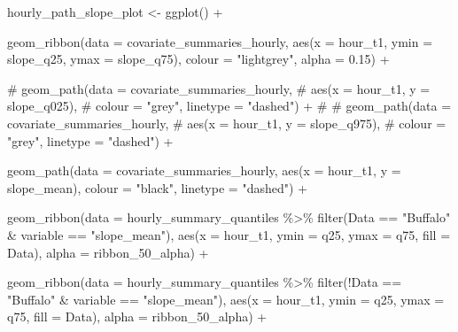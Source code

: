 \documentclass[
  letterpaper,
  DIV=11,
  numbers=noendperiod]{scrartcl}
\newenvironment{Shaded}{\begin{snugshade}}{\end{snugshade}}
\newcommand{\AttributeTok}[1]{\textcolor[rgb]{0.40,0.45,0.13}{#1}}
\newcommand{\CommentTok}[1]{\textcolor[rgb]{0.37,0.37,0.37}{#1}}
\newcommand{\FloatTok}[1]{\textcolor[rgb]{0.68,0.00,0.00}{#1}}
\newcommand{\FunctionTok}[1]{\textcolor[rgb]{0.28,0.35,0.67}{#1}}
\newcommand{\NormalTok}[1]{\textcolor[rgb]{0.00,0.23,0.31}{#1}}
\newcommand{\OtherTok}[1]{\textcolor[rgb]{0.00,0.23,0.31}{#1}}
\newcommand{\SpecialCharTok}[1]{\textcolor[rgb]{0.37,0.37,0.37}{#1}}
\newcommand{\StringTok}[1]{\textcolor[rgb]{0.13,0.47,0.30}{#1}}
\begin{document}
\begin{Shaded}
\begin{Highlighting}[]
\NormalTok{hourly\_path\_slope\_plot }\OtherTok{\textless{}{-}} \FunctionTok{ggplot}\NormalTok{() }\SpecialCharTok{+}
  
  \FunctionTok{geom\_ribbon}\NormalTok{(}\AttributeTok{data =}\NormalTok{ covariate\_summaries\_hourly,}
              \FunctionTok{aes}\NormalTok{(}\AttributeTok{x =}\NormalTok{ hour\_t1, }\AttributeTok{ymin =}\NormalTok{ slope\_q25, }\AttributeTok{ymax =}\NormalTok{ slope\_q75),}
              \AttributeTok{colour =} \StringTok{"lightgrey"}\NormalTok{, }\AttributeTok{alpha =} \FloatTok{0.15}\NormalTok{) }\SpecialCharTok{+}
  
  \CommentTok{\# geom\_path(data = covariate\_summaries\_hourly,}
  \CommentTok{\#           aes(x = hour\_t1, y = slope\_q025),}
  \CommentTok{\#           colour = "grey", linetype = "dashed") +}
  \CommentTok{\# }
  \CommentTok{\# geom\_path(data = covariate\_summaries\_hourly,}
  \CommentTok{\#           aes(x = hour\_t1, y = slope\_q975),}
  \CommentTok{\#           colour = "grey", linetype = "dashed") +}

  \FunctionTok{geom\_path}\NormalTok{(}\AttributeTok{data =}\NormalTok{ covariate\_summaries\_hourly,}
            \FunctionTok{aes}\NormalTok{(}\AttributeTok{x =}\NormalTok{ hour\_t1, }\AttributeTok{y =}\NormalTok{ slope\_mean),}
            \AttributeTok{colour =} \StringTok{"black"}\NormalTok{, }\AttributeTok{linetype =} \StringTok{"dashed"}\NormalTok{) }\SpecialCharTok{+}

  \FunctionTok{geom\_ribbon}\NormalTok{(}\AttributeTok{data =}\NormalTok{ hourly\_summary\_quantiles }\SpecialCharTok{\%\textgreater{}\%} 
                \FunctionTok{filter}\NormalTok{(Data }\SpecialCharTok{==} \StringTok{"Buffalo"} \SpecialCharTok{\&}\NormalTok{ variable }\SpecialCharTok{==} \StringTok{"slope\_mean"}\NormalTok{),}
              \FunctionTok{aes}\NormalTok{(}\AttributeTok{x =}\NormalTok{ hour\_t1, }\AttributeTok{ymin =}\NormalTok{ q25, }\AttributeTok{ymax =}\NormalTok{ q75, }\AttributeTok{fill =}\NormalTok{ Data),}
              \AttributeTok{alpha =}\NormalTok{ ribbon\_50\_alpha) }\SpecialCharTok{+}

  \FunctionTok{geom\_ribbon}\NormalTok{(}\AttributeTok{data =}\NormalTok{ hourly\_summary\_quantiles }\SpecialCharTok{\%\textgreater{}\%} 
                \FunctionTok{filter}\NormalTok{(}\SpecialCharTok{!}\NormalTok{Data }\SpecialCharTok{==} \StringTok{"Buffalo"} \SpecialCharTok{\&}\NormalTok{ variable }\SpecialCharTok{==} \StringTok{"slope\_mean"}\NormalTok{),}
              \FunctionTok{aes}\NormalTok{(}\AttributeTok{x =}\NormalTok{ hour\_t1, }\AttributeTok{ymin =}\NormalTok{ q25, }\AttributeTok{ymax =}\NormalTok{ q75, }\AttributeTok{fill =}\NormalTok{ Data),}
              \AttributeTok{alpha =}\NormalTok{ ribbon\_50\_alpha) }\SpecialCharTok{+}
  

\end{Highlighting}
\end{Shaded}
\end{document}
